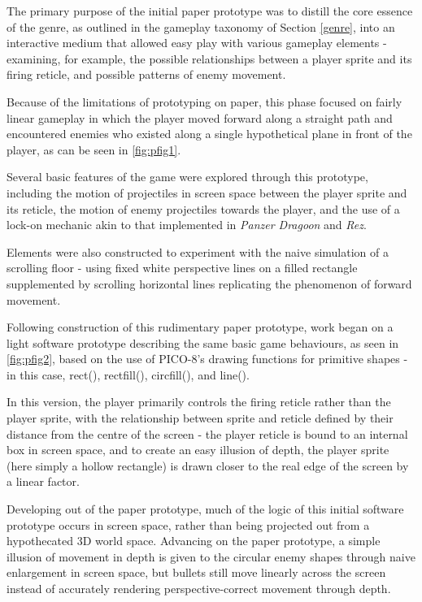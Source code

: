 \documentclass[11pt]{article}
\begin{document}
The primary purpose of the initial paper prototype was to distill the core essence of the
genre, as outlined in the gameplay taxonomy of Section \ref{genre}, into an interactive
medium that allowed easy play with various gameplay elements - examining, for example,
the possible relationships between a player sprite and its firing reticle, and possible
patterns of enemy movement.

Because of the limitations of prototyping on paper, this
phase focused on fairly linear gameplay in which the player moved forward along a straight
path and encountered enemies who existed along a single hypothetical plane in front of
the player, as can be seen in \ref{fig:pfig1}.

Several basic features of the game were explored through this prototype, including the
motion of projectiles in screen space between the player sprite and its reticle, the
motion of enemy projectiles towards the player, and the use of a lock-on mechanic akin to
that implemented in \textit{Panzer Dragoon} and \textit{Rez}.

Elements were also constructed to experiment with the naive simulation of a scrolling
floor - using fixed white perspective lines on a filled rectangle supplemented by
scrolling horizontal lines replicating the phenomenon of forward movement.

Following construction of this rudimentary paper prototype, work began on a light software
prototype describing the same basic game behaviours, as seen in \ref{fig:pfig2}, based on the
use of PICO-8's drawing functions for primitive shapes - in this case, rect(), rectfill(),
circfill(), and line().

In this version, the player primarily controls the firing reticle rather than the player sprite,
with the relationship between sprite and reticle defined by their distance from the centre of the
screen - the player reticle is bound to an internal box in screen space, and to create an easy
illusion of depth, the player sprite (here simply a hollow rectangle) is drawn closer to the
real edge of the screen by a linear factor.

Developing out of the paper prototype, much of the logic of this initial software prototype occurs
in screen space, rather than being projected out from a hypothecated 3D world space. Advancing on
the paper prototype, a simple illusion of movement in depth is given to the circular enemy shapes
through naive enlargement in screen space, but bullets still move linearly across the screen instead
of accurately rendering perspective-correct movement through depth.
\end{document}
